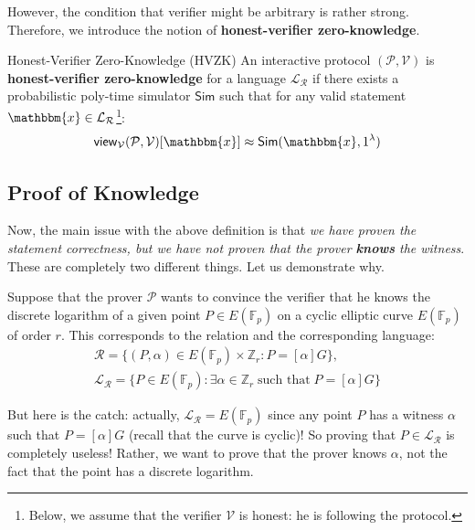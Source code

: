 \documentclass[../lecture-notes-148x210.tex]{subfiles}
\begin{document}
However, the condition that verifier might be arbitrary is rather strong.
Therefore, we introduce the notion of \textbf{honest-verifier zero-knowledge}.

\begin{definition}{Honest-Verifier Zero-Knowledge (HVZK)}
    An interactive protocol $(\mathcal{P}, \mathcal{V})$ is
    \textbf{honest-verifier zero-knowledge} for a language
    $\mathcal{L}_{\mathcal{R}}$ if there exists a probabilistic poly-time
    simulator $\mathsf{Sim}$ such that for any valid statement $\mathbbm{x} \in
    \mathcal{L}_{\mathcal{R}}$\footnote{Below, we assume that the verifier
    $\mathcal{V}$ is honest: he is following the protocol.}:
    \begin{equation*}
        \mathsf{view}_{\mathcal{V}}(\mathcal{P}, \mathcal{V})[\mathbbm{x}] \approx \mathsf{Sim}(\mathbbm{x},1^{\lambda})
    \end{equation*}
\end{definition}

\subsection{Proof of Knowledge}

Now, the main issue with the above definition is that \textit{we have proven the
statement correctness, but we have not proven that the prover \textbf{knows} the
witness}. These are completely two different things. Let us demonstrate why.

\begin{example}
    Suppose that the prover $\mathcal{P}$ wants to convince the verifier that he
    knows the discrete logarithm of a given point $P \in E(\mathbb{F}_p)$ on a
    cyclic elliptic curve $E(\mathbb{F}_p)$ of order $r$. This corresponds to
    the relation and the corresponding language:
    \begin{align*}
        \mathcal{R} = \{(P, \alpha) \in E(\mathbb{F}_p) \times \mathbb{Z}_r: P = [\alpha] G\}, \\ \mathcal{L}_{\mathcal{R}} = \{P \in E(\mathbb{F}_p): \exists \alpha \in \mathbb{Z}_r \; \text{such that} \; P = [\alpha] G\}
    \end{align*}

    But here is the catch: actually, $\mathcal{L}_{\mathcal{R}} =
    E(\mathbb{F}_p)$ since any point $P$ has a witness $\alpha$ such that $P =
    [\alpha] G$ (recall that the curve is cyclic)! So proving that $P \in
    \mathcal{L}_{\mathcal{R}}$ is completely useless! Rather, we want to prove
    that the prover knows $\alpha$, not the fact that the point has a discrete
    logarithm.
\end{example}
\end{document}
